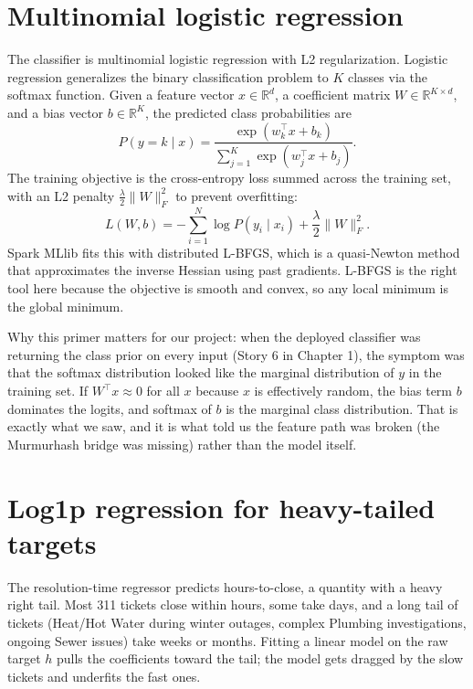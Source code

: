 \documentclass[11pt,letterpaper]{book}
\begin{document}
\section{Multinomial logistic regression}

The classifier is multinomial logistic regression with L2 regularization. Logistic regression generalizes the binary classification problem to $K$ classes via the softmax function. Given a feature vector $x \in \mathbb{R}^d$, a coefficient matrix $W \in \mathbb{R}^{K \times d}$, and a bias vector $b \in \mathbb{R}^K$, the predicted class probabilities are
\begin{equation}
P(y = k \mid x) = \frac{\exp(w_k^\top x + b_k)}{\sum_{j=1}^K \exp(w_j^\top x + b_j)}.
\end{equation}
The training objective is the cross-entropy loss summed across the training set, with an L2 penalty $\frac{\lambda}{2} \|W\|_F^2$ to prevent overfitting:
\begin{equation}
L(W, b) = -\sum_{i=1}^N \log P(y_i \mid x_i) + \frac{\lambda}{2} \|W\|_F^2.
\end{equation}
Spark MLlib fits this with distributed L-BFGS, which is a quasi-Newton method that approximates the inverse Hessian using past gradients. L-BFGS is the right tool here because the objective is smooth and convex, so any local minimum is the global minimum.

Why this primer matters for our project: when the deployed classifier was returning the class prior on every input (Story 6 in Chapter 1), the symptom was that the softmax distribution looked like the marginal distribution of $y$ in the training set. If $W^\top x \approx 0$ for all $x$ because $x$ is effectively random, the bias term $b$ dominates the logits, and softmax of $b$ is the marginal class distribution. That is exactly what we saw, and it is what told us the feature path was broken (the Murmurhash bridge was missing) rather than the model itself.

\section{Log1p regression for heavy-tailed targets}

The resolution-time regressor predicts hours-to-close, a quantity with a heavy right tail. Most 311 tickets close within hours, some take days, and a long tail of tickets (Heat/Hot Water during winter outages, complex Plumbing investigations, ongoing Sewer issues) take weeks or months. Fitting a linear model on the raw target $h$ pulls the coefficients toward the tail; the model gets dragged by the slow tickets and underfits the fast ones.
\end{document}
